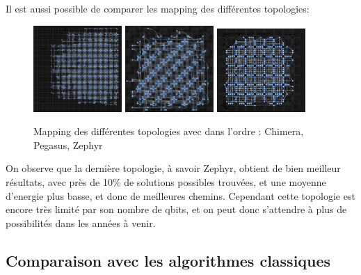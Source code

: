 \documentclass{article}
\begin{document}
        Il est aussi possible de comparer les mapping des différentes topologies:\\
        \begin{figure}[h]
            \centering
            \includegraphics[width=0.3\textwidth]{chimera}
            \includegraphics[width=0.3\textwidth]{pegasus}
            \includegraphics[width=0.3\textwidth]{zephyr}
            \caption{Mapping des différentes topologies avec dans l'ordre : Chimera, Pegasus, Zephyr}
            \label{fig:topologies_mapping}
        \end{figure}


        On observe que la dernière topologie, à savoir Zephyr, obtient de bien meilleur résultats, avec près de 10\% de solutions possibles trouvées, et une moyenne d'energie plus basse, et donc de meilleures chemins.
        Cependant cette topologie est encore très limité par son nombre de qbits, et on peut donc s'attendre à plus de possibilités dans les années à venir.




        \subsection{Comparaison avec les algorithmes classiques}\label{subsec:comparaison-avec-les-algorithmes-classiques}
\end{document}
